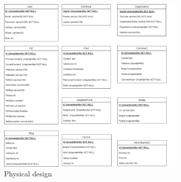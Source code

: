 \begin {figure}[H]
\centering
\includegraphics[width=0.8\textwidth]{Figures/physical_db.png}
\caption{Physical design}
\end{figure}




